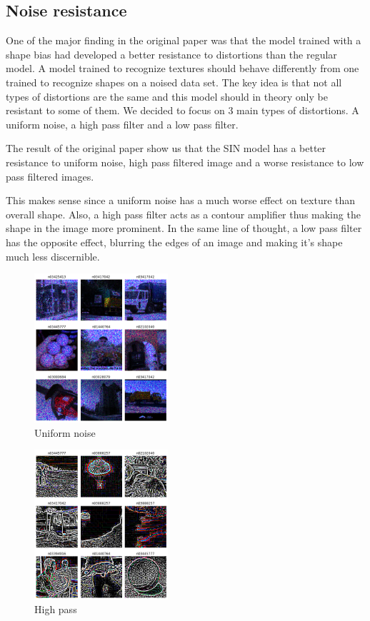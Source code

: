 \documentclass{article}
\begin{document}
\subsection{Noise resistance}


One of the major finding in the original paper was that the model trained with a 
shape bias had developed a better resistance to distortions than the regular model.
A model trained to recognize textures should behave differently from 
one trained to recognize shapes on a noised data set.  
The key idea is that not all types of distortions are the same and this model 
should in theory only be resistant to some of them.  We decided to focus on 3 main types of distortions.  
A uniform noise, a high pass filter and a low pass filter. \medskip \par

\noindent
The result of the original paper show us that the SIN model has a better resistance to uniform noise, high pass filtered image and a worse resistance to low pass filtered images.

\noindent
This makes sense since a uniform noise has a much worse effect on texture than overall shape. Also, a high pass filter acts as a contour amplifier thus making the shape in the image more prominent. In the same line of thought, a low pass filter has the opposite effect, blurring the edges of an image and making it's shape much less discernible.

\begin{figure}[h!]
\centering
\includegraphics[width = 0.44\textwidth]{imgs/image_uniform}
\caption{Uniform noise}
\end{figure}

\begin{figure}[h!]
\centering
\includegraphics[width = 0.44\textwidth]{imgs/image_high}
\caption{High pass}
\end{figure}
\end{document}
